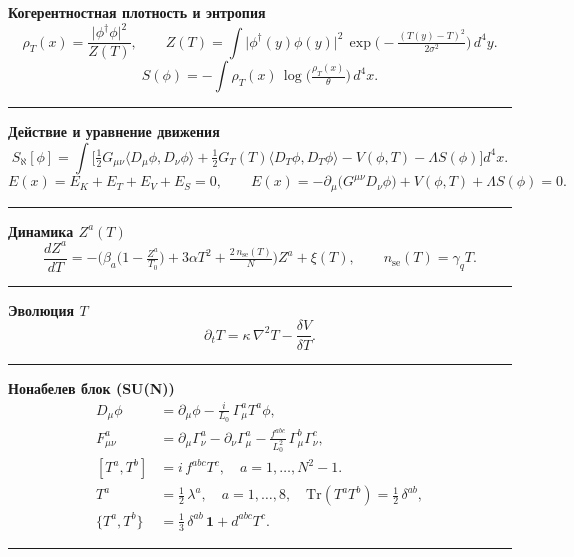 \documentclass[a4paper,12pt]{article}
\begin{document}
\noindent\textbf{Когерентностная плотность и энтропия}\\[-0.25em]
\[
\rho_{T}(x)=\frac{\lvert\phi^{\dagger}\phi\rvert^{2}}{Z(T)},\qquad
Z(T)=\int \lvert\phi^{\dagger}(y)\phi(y)\rvert^{2}\,\exp\!\Big(-\tfrac{(T(y)-T)^{2}}{2\sigma^{2}}\Big)\,d^{4}y.\tag{F6}
\]
\[
S(\phi)=-\int \rho_{T}(x)\,\log\!\Big(\tfrac{\rho_{T}(x)}{\theta}\Big)\,d^{4}x.\tag{F7}
\]
\vspace{0.25em}\hrule\vspace{0.5em}

\noindent\textbf{Действие и уравнение движения}\\[-0.25em]
\[
S_{\aleph}[\phi]=\int\Big[\tfrac{1}{2}G_{\mu\nu}\langle D_{\mu}\phi,D_{\nu}\phi\rangle+\tfrac{1}{2}G_{T}(T)\langle D_{T}\phi,D_{T}\phi\rangle- V(\phi,T)-\Lambda S(\phi)\Big]d^{4}x.\tag{F8}
\]
\[
E(x)=E_{K}+E_{T}+E_{V}+E_{S}=0,\qquad
E(x)=-\partial_{\mu}\big(G^{\mu\nu}D_{\nu}\phi\big)+V(\phi,T)+\Lambda S(\phi)=0.\tag{F9}
\]
\vspace{0.25em}\hrule\vspace{0.5em}

\noindent\textbf{Динамика $Z^{a}(T)$}\\[-0.25em]
\[
\frac{dZ^{a}}{dT}=-\Big(\beta_{a}\big(1-\tfrac{Z^{a}}{T_{0}}\big)+3\alpha T^{2}+\tfrac{2\,n_{\mathrm{se}}(T)}{N}\Big)Z^{a}+\xi(T),\qquad n_{\mathrm{se}}(T)=\gamma_{q}T.\tag{F10}
\]
\vspace{0.25em}\hrule\vspace{0.5em}

\noindent\textbf{Эволюция $T$}\\[-0.25em]
\[
\partial_{t}T=\kappa\,\nabla^{2}T-\frac{\delta V}{\delta T}.\tag{F11}
\]
\vspace{0.25em}\hrule\vspace{0.5em}

\noindent\textbf{Нонабелев блок (SU(N))}\\[-0.25em]
\[
\begin{aligned}
D_{\mu}\phi&=\partial_{\mu}\phi-\tfrac{i}{L_{0}}\,\Gamma^{a}_{\mu}T^{a}\phi,\\
F^{a}_{\mu\nu}&=\partial_{\mu}\Gamma^{a}_{\nu}-\partial_{\nu}\Gamma^{a}_{\mu}-\tfrac{f^{abc}}{L_{0}^{2}}\,\Gamma^{b}_{\mu}\Gamma^{c}_{\nu},\\
[T^{a},T^{b}]&=i\,f^{abc}T^{c},\quad a=1,\dots, N^{2}-1.\\[0.25em]
T^{a}&=\tfrac{1}{2}\,\lambda^{a},\quad a=1,\dots,8,\quad \mathrm{Tr}(T^{a}T^{b})=\tfrac{1}{2}\,\delta^{ab},\\
\{T^{a},T^{b}\}&=\tfrac{1}{3}\,\delta^{ab}\,\mathbf{1}+d^{abc}T^{c}.
\end{aligned}\tag{F12}
\]
\vspace{0.25em}\hrule\vspace{0.5em}
\end{document}
